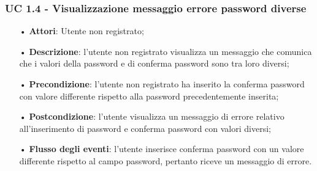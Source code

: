\subsubsection{UC 1.4 - Visualizzazione messaggio errore password diverse}
\begin{itemize}
	\item[•]\textbf{Attori}: Utente non registrato;
	\item[•]\textbf{Descrizione}: l'utente non registrato visualizza un messaggio che comunica che i valori della password e di conferma password sono tra loro diversi;
	\item[•]\textbf{Precondizione}: l'utente non registrato ha inserito la conferma password con valore differente rispetto alla password precedentemente inserita;
	\item[•]\textbf{Postcondizione}: l'utente visualizza un messaggio di errore relativo all'inserimento di password e conferma password con valori diversi;
	\item[•]\textbf{Flusso degli eventi}: l'utente inserisce conferma password con un valore differente rispetto al campo password, pertanto riceve un messaggio di errore.
\end{itemize}

